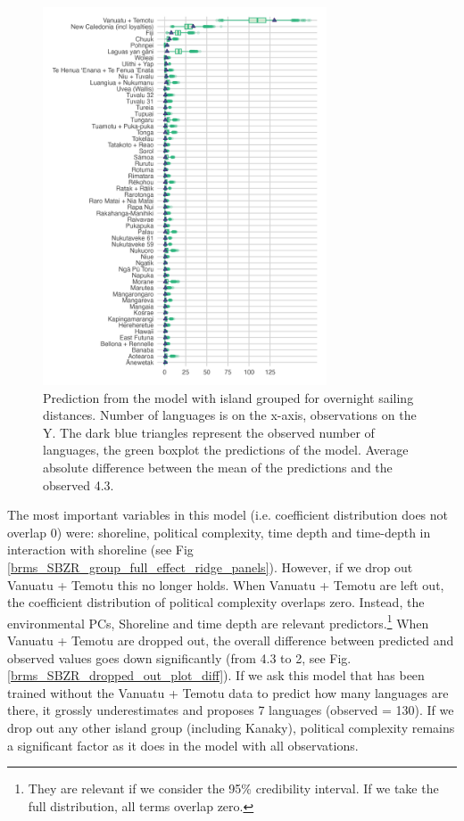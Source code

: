 \documentclass[12pt,letterpaper]{article}
\begin{document}
\begin{figure}[ht]
\centering
\includegraphics[width=0.75\textwidth]{latex/brms_predict_SBZR.png}
\caption{Prediction from the model with island grouped for overnight sailing distances. Number of languages is on the x-axis, observations on the Y. The dark blue triangles represent the observed number of languages, the green boxplot the predictions of the model. Average absolute difference between the mean of the predictions and the observed  4.3.}
\label{SBZR_model_predict}
\end{figure}

The most important variables in this model (i.e. coefficient distribution does not overlap 0) were: shoreline, political complexity, time depth and time-depth in interaction with shoreline (see Fig \ref{brms_SBZR_group_full_effect_ridge_panels}). However, if we drop out Vanuatu + Temotu this no longer holds. When Vanuatu + Temotu are left out, the coefficient distribution of political complexity overlaps zero. Instead, the environmental PCs, Shoreline and time depth are relevant predictors.\footnote{They are relevant if we consider the 95\% credibility interval. If we take the full distribution, all terms overlap zero.} When Vanuatu + Temotu are dropped out, the overall difference between predicted and observed values goes down significantly (from 4.3 to 2, see Fig. \ref{brms_SBZR_dropped_out_plot_diff}). If we ask this model that has been trained without the Vanuatu + Temotu data to predict how many languages are there, it grossly underestimates and proposes 7 languages (observed = 130). If we drop out any other island group (including Kanaky), political complexity remains a significant factor as it does in the model with all observations.
\end{document}

